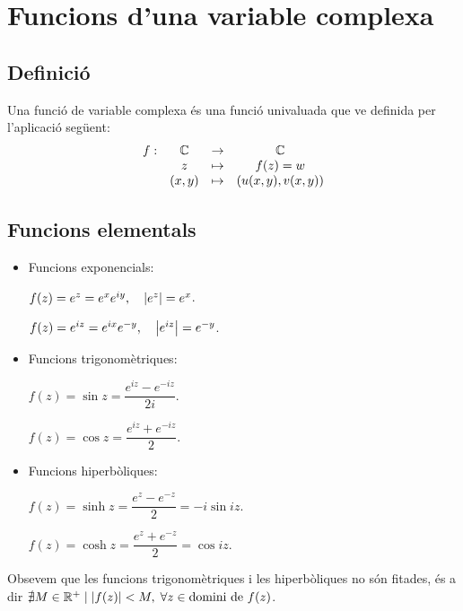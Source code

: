 \section{Funcions d'una variable complexa}
\subsection{Definició}
\begin{defi}
    Una funció de variable complexa és una funció univaluada que ve definida per l'aplicació següent:
    \begin{align}
        \begin{matrix}
            f: & \mathbb{C} & \to & \mathbb{C} \\
            & z & \mapsto & f(z) = w \\
            & (x,y) & \mapsto & (u(x,y),v(x,y))
        \end{matrix}
    \end{align}
\end{defi}

\subsection{Funcions elementals}
\begin{itemize}
    \item Funcions exponencials:
    
    $f(z) = e^{z} = e^{x} e^{iy}, \quad \left| e^{z} \right| = e^{x}$.
    
    $f(z) = e^{iz} = e^{ix} e^{-y}, \quad \left| e^{iz} \right| = e^{-y}$.
    \item Funcions trigonomètriques:
    
    $f(z) = \sin z = \dfrac{e^{iz} - e^{-iz}}{2i}$.
    
    $f(z) = \cos z = \dfrac{e^{iz} + e^{-iz}}{2}$.
    \item Funcions hiperbòliques:
    
    $f(z) = \sinh z = \dfrac{e^{z} - e^{-z}}{2} = -i \sin iz$.
    
    $f(z) = \cosh z = \dfrac{e^{z} + e^{-z}}{2} = \cos iz$.
\end{itemize}
Obsevem que les funcions trigonomètriques i les hiperbòliques no són fitades, és a dir $\nexists M \in \mathbb{R}^{+} \mid \left| f(z) \right| < M, \; \forall z \in \text{domini de } f(z)$.

